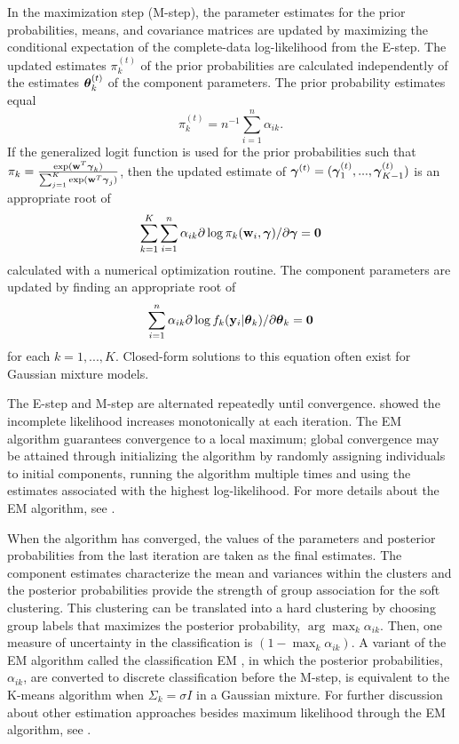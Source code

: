In the maximization step (M-step), the parameter estimates for the prior probabilities, means, and covariance matrices are updated by maximizing the conditional expectation of the complete-data log-likelihood from the E-step. The updated estimates $\pi_{k}^{(t)}$ of the prior probabilities are calculated independently of the estimates $\boldsymbol\theta_{k}^{(t)}$ of the component parameters. The prior probability estimates equal 
$$\pi_{k}^{(t)}=n^{-1}\sum^{n}_{i=1}\alpha_{ik}.$$
If the generalized logit function is used for the prior probabilities such that $\pi_{k} = \frac{\exp(\mathbf w^T \boldsymbol \gamma_k) }{\sum_{j=1}^K \exp(\mathbf w^T \boldsymbol \gamma_j)}$, then the updated estimate of $\boldsymbol\gamma^{(t)}=(\boldsymbol\gamma_{1}^{(t)},...,\boldsymbol\gamma_{K-1}^{(t)})$ is an appropriate root of 
$$\sum^{K}_{k=1}\sum^{n}_{i=1}\alpha_{ik}\partial\log \pi_{k}(\mathbf w_{i},\boldsymbol\gamma)/\partial \boldsymbol\gamma = \mathbf 0$$
calculated with a numerical optimization routine. The component parameters are updated by finding an appropriate root of 
$$\sum^{n}_{i=1}\alpha_{ik}\partial\log f_{k}(\mathbf y_{i}|\boldsymbol\theta_k) /\partial \boldsymbol\theta_{k} =\mathbf 0$$
for each $k=1,...,K$. Closed-form solutions to this equation often exist for Gaussian mixture models.  

The E-step and M-step are alternated repeatedly until convergence. \Textcite{dempster1977} showed the incomplete likelihood increases monotonically at each iteration. The EM algorithm guarantees convergence to a local maximum; global convergence may be attained through initializing the algorithm by randomly assigning individuals to initial components, running the algorithm multiple times and using the estimates associated with the highest log-likelihood. For more details about the EM algorithm, see \textcite{mclachlan1997}. 

When the algorithm has converged, the values of the parameters and posterior probabilities from the last iteration are taken as the final estimates. The component estimates characterize the mean and variances within the clusters and the posterior probabilities provide the strength of group association for the soft clustering. This clustering can be translated into a hard clustering by choosing group labels that maximizes the posterior probability, $\arg\max_k \alpha_{ik}$. Then, one measure of uncertainty in the classification is $(1-\max_k\alpha_{ik}).$ A variant of the EM algorithm called the classification EM \cite{celeux1992}, in which the posterior probabilities, $\alpha_{ik}$, are converted to discrete classification before the M-step, is equivalent to the K-means algorithm when $\Sigma_{k} =\sigma I$ in a Gaussian mixture. For further discussion about other estimation approaches besides maximum likelihood through the EM algorithm, see \textcite{mclachlan2000}.


